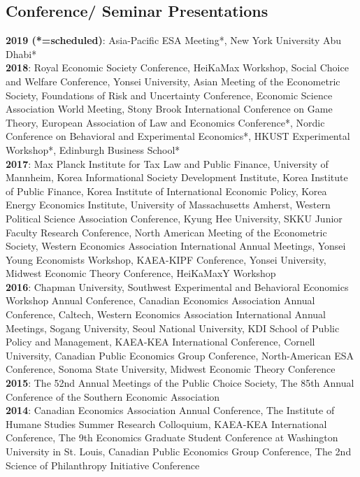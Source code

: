 \documentclass[margin, letterpaper]{res}
\begin{document}
\begin{resume}
\section{Conference/ Seminar Presentations}
\textbf{2019 (*=scheduled)}: Asia-Pacific ESA Meeting*, New York University Abu Dhabi*\\
\textbf{2018}: Royal Economic Society Conference, HeiKaMax Workshop, Social Choice and Welfare Conference, Yonsei University, Asian Meeting of the Econometric Society, Foundations of Risk and Uncertainty Conference, Economic Science Association World Meeting, Stony Brook International Conference on Game Theory, European Association of Law and Economics Conference*, Nordic Conference on Behavioral and Experimental Economics*, HKUST Experimental Workshop*, Edinburgh Business School*\\
\textbf{2017}: Max Planck Institute for Tax Law and Public Finance, University of Mannheim, Korea Informational Society Development Institute, Korea Institute of Public Finance, Korea Institute of International Economic Policy, Korea Energy Economics Institute, University of Massachusetts Amherst, Western Political Science Association Conference, Kyung Hee University, SKKU Junior Faculty Research Conference, North American Meeting of the Econometric Society, Western Economics Association International Annual Meetings, Yonsei Young Economists Workshop, KAEA-KIPF Conference, Yonsei University, Midwest Economic Theory Conference, HeiKaMaxY Workshop\\
\textbf{2016}: Chapman University, Southwest Experimental and Behavioral Economics Workshop Annual Conference, Canadian Economics Association Annual Conference, Caltech, Western Economics Association International Annual Meetings, Sogang University, Seoul National University, KDI School of Public Policy and Management, KAEA-KEA International Conference, Cornell University, Canadian Public Economics Group Conference, North-American ESA Conference, Sonoma State University, Midwest Economic Theory Conference\\
\textbf{2015}: The 52nd Annual Meetings of the Public Choice Society, The 85th Annual Conference of the Southern Economic Association\\
\textbf{2014}: Canadian Economics Association Annual Conference, The Institute of Humane Studies Summer Research Colloquium, KAEA-KEA International Conference, The 9th Economics Graduate Student Conference at Washington University in St. Louis, Canadian Public Economics Group Conference, The 2nd Science of Philanthropy Initiative Conference


\end{resume}
\end{document}
